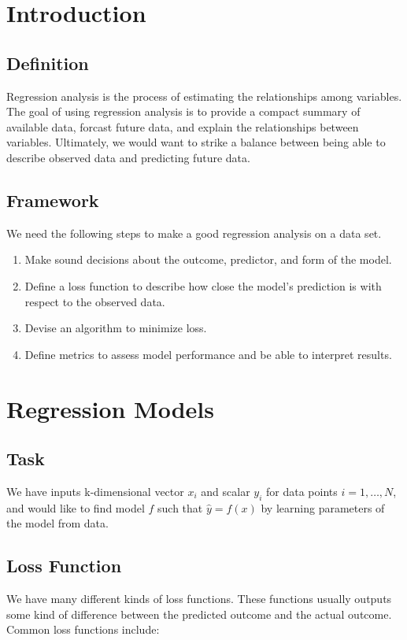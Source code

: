 
\section{Introduction}

\subsection{Definition} 
Regression analysis is the process of estimating the relationships among variables. The goal of using regression analysis is to provide a compact summary of available data, forcast future data, and explain the relationships between variables. Ultimately, we would want to strike a balance between being able to describe observed data and predicting future data.

\subsection{Framework}
We need the following steps to make a good regression analysis on a data set.
\begin{enumerate}
  \item Make sound decisions about the outcome, predictor, and form of the model.
  \item Define a loss function to describe how close the model's prediction is with respect to the observed data.
  \item Devise an algorithm to minimize loss.
  \item Define metrics to assess model performance and be able to interpret results.
\end{enumerate}

\section{Regression Models}

\subsection{Task}
We have inputs k-dimensional vector $x_i$ and scalar $y_i$ for data points $i=1,\dots, N$, and would like to find model $f$ such that $\hat{y}=f(x)$ by learning parameters of the model from data. 

\subsection{Loss Function}
We have many different kinds of loss functions. These functions usually outputs some kind of difference between the predicted outcome and the actual outcome. Common loss functions include:
